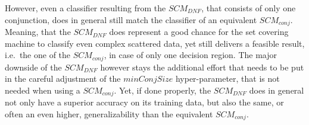 However, even a classifier resulting from the \(SCM_{DNF}\), that consists of only one conjunction,
does in general still match the classifier of an equivalent \(SCM_{conj}\).
Meaning, that the \(SCM_{DNF}\) does represent a good chance for the set covering machine
to classify even complex scattered data, yet still delivers a feasible result, i.e.\ the one
of the \(SCM_{conj}\), in case of only one decision region.
The major downside of the \(SCM_{DNF}\) however stays the additional effort that needs to
be put in the careful adjustment of the \(minConjSize\) hyper-parameter, that is not needed
when using a \(SCM_{conj}\).
Yet, if done properly, the \(SCM_{DNF}\) does in general not only have a superior accuracy on its training
data, but also the same, or often an even higher, generalizability than the equivalent \(SCM_{conj}\).